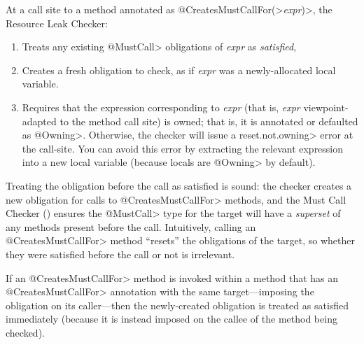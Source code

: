 
At a call site to a method annotated as
\<@CreatesMustCallFor(>\emph{expr}\<)>, the Resource Leak Checker:
\begin{enumerate}
\item
  Treats any existing \<@MustCall> obligations of \emph{expr} as \emph{satisfied},
\item
  Creates a fresh obligation to check, as if \emph{expr} was a newly-allocated local
  variable.
\item
  Requires that the expression corresponding to \emph{expr} (that is, \emph{expr}
  viewpoint-adapted to the method call site) is owned; that is, it is
  annotated or defaulted as \<@Owning>.  Otherwise, the checker
  will issue a \<reset.not.owning> error at the call-site. You can avoid this
  error by extracting the relevant expression into a new local variable (because
  locals are \<@Owning> by default).
\end{enumerate}

Treating the obligation before the call as satisfied is sound: the
checker creates a new obligation for calls to \<@CreatesMustCallFor> methods,
and the Must Call Checker () ensures the
\<@MustCall> type for the target will have a \emph{superset} of any methods
present before the call. Intuitively, calling an \<@CreatesMustCallFor> method
``resets'' the obligations of the target, so whether they were satisfied before
the call or not is irrelevant.

If an \<@CreatesMustCallFor>
method is invoked within a method that has an \<@CreatesMustCallFor> annotation
with the same target---imposing the obligation on its caller---then
the newly-created obligation is treated as satisfied immediately (because it is instead imposed
on the callee of the method being checked).



